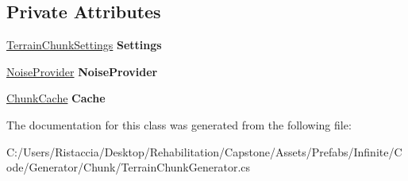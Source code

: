 \subsection*{Private Attributes}
\begin{DoxyCompactItemize}
\item 
\mbox{\label{class_terrain_generator_1_1_terrain_chunk_generator_afe28e51c9376c42b10d6f15e6cf50608}} 
\hyperlink{class_terrain_generator_1_1_terrain_chunk_settings}{Terrain\+Chunk\+Settings} {\bfseries Settings}
\item 
\mbox{\label{class_terrain_generator_1_1_terrain_chunk_generator_abc45f5b7f34c6db085a4680968535e8c}} 
\hyperlink{class_terrain_generator_1_1_noise_provider}{Noise\+Provider} {\bfseries Noise\+Provider}
\item 
\mbox{\label{class_terrain_generator_1_1_terrain_chunk_generator_afc1db6db32d4c484449d591330b47adc}} 
\hyperlink{class_terrain_generator_1_1_chunk_cache}{Chunk\+Cache} {\bfseries Cache}
\end{DoxyCompactItemize}


The documentation for this class was generated from the following file\+:\begin{DoxyCompactItemize}
\item 
C\+:/\+Users/\+Ristaccia/\+Desktop/\+Rehabilitation/\+Capstone/\+Assets/\+Prefabs/\+Infinite/\+Code/\+Generator/\+Chunk/Terrain\+Chunk\+Generator.\+cs\end{DoxyCompactItemize}
